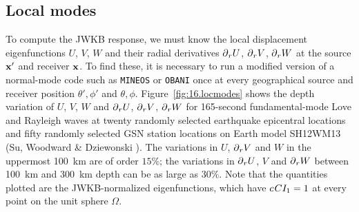 \subsection{Local modes}
%
%

To compute the JWKB response, we must know the local
displacement eigenfunctions $U$, $V$, $W$ and their
radial derivatives $\mbox{$\partial$}_rU$, $\mbox{$\partial$}_rV$, $\mbox{$\partial$}_rW$ at the
source $\mbox{${\bf x}$}'$ and receiver $\mbox{${\bf x}$}$.  To find these,
it is necessary to run a modified version of a
normal-mode code such as {\tt MINEOS\/} or {\tt OBANI\/}
%
%
once at every geographical source and receiver position
$\theta',\phi'$ and $\theta,\phi$.  Figure~\ref{fig:16.locmodes}
shows the depth variation of $U$, $V$, $W$ and $\mbox{$\partial$}_rU$, $\mbox{$\partial$}_rV$,
$\mbox{$\partial$}_rW$ for 165-second fundamental-mode Love and Rayleigh waves
at twenty randomly selected earthquake epicentral locations and
fifty randomly selected GSN station locations on Earth model
SH12WM13 (Su, Woodward \& Dziewonski \citeyear{su&al94}).
The variations in $U$, $\mbox{$\partial$}_rV$ and $W$ in the uppermost
100~km are of order $15\%$; the variations in $\mbox{$\partial$}_rU$, $V$
and  $\mbox{$\partial$}_rW$ between 100~km and 300~km depth can be as
large as $30\%$.  Note that the quantities plotted are
the JWKB-normalized eigenfunctions, which have
$c\hspace{0.3 mm}CI_1=1$ at every point on the unit sphere $\Omega$.
